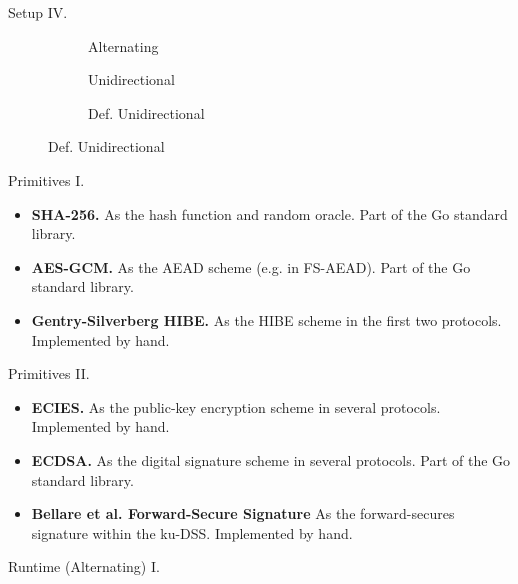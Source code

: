 \documentclass{beamer}
\begin{document}
\begin{frame}{Setup IV.}
  \begin{figure}[H]
    \centering
    \noindent\begin{subfigure}[t]{0.32\linewidth}
      \centering
      
      \caption{Alternating}
    \end{subfigure}%
    \begin{subfigure}[t]{0.32\linewidth}
      \centering
      
      \caption{Unidirectional}
    \end{subfigure}%
    \begin{subfigure}[t]{0.32\linewidth}
      \centering
      
      \caption{Def. Unidirectional}
    \end{subfigure}
  \end{figure}
\end{frame}

\begin{frame}{Primitives I.}
  \begin{itemize}
  \item \textbf{SHA-256.} As the hash function and random oracle. Part of
    the Go standard library.
  \item \textbf{AES-GCM.} As the AEAD scheme (e.g. in FS-AEAD). Part of
    the Go standard library.
  \item \textbf{Gentry-Silverberg HIBE.} As the HIBE scheme in the first
    two protocols. Implemented by hand.
  \end{itemize}
\end{frame}

\begin{frame}{Primitives II.}
  \begin{itemize}
   \item \textbf{ECIES.} As the public-key encryption scheme in several protocols.
    Implemented by hand.
  \item \textbf{ECDSA.} As the digital signature scheme in several protocols.
    Part of the Go standard library.
  \item \textbf{Bellare et al. Forward-Secure Signature} As the forward-secures
    signature within the ku-DSS. Implemented by hand.
  \end{itemize}
\end{frame}

\begin{frame}{Runtime (Alternating) I.}
  \begin{figure}[H]
    \centering
     
  \end{figure}
\end{frame}
\end{document}
